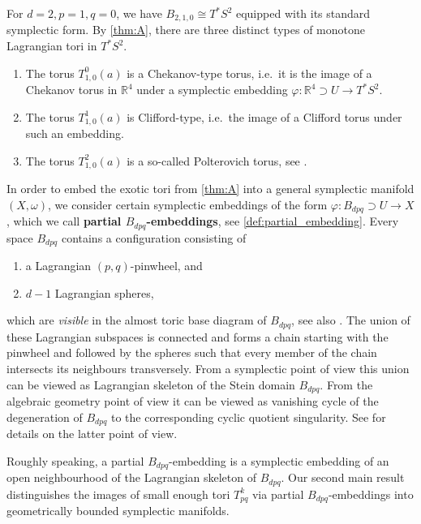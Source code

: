 \documentclass[12pt,a4paper,abstract=true,draft]{scrartcl}
\begin{document}
\begin{example}
    \label{ex:cotangent}
    For $d=2, p=1, q=0$, we have $B_{2,1,0} \cong T^*S^2$ equipped with its standard symplectic form.
By \cref{thm:A}, there are three distinct types of monotone Lagrangian tori in $T^*S^2$. 
    \begin{enumerate}
        \item The torus $T^0_{1,0}(a)$ is a Chekanov-type torus, i.e.\ it is the image of a Chekanov torus in $\mathbb{R}^4$ under a symplectic embedding $\varphi \colon \mathbb{R}^4 \supset U \rightarrow T^*S^2$.
        \item The torus $T^1_{1,0}(a)$ is Clifford-type, i.e.\ the image of a Clifford torus under such an embedding.
        \item The torus $T^2_{1,0}(a)$ is a so-called Polterovich torus, see \cite{AlbFra08}. 
    \end{enumerate} 
\end{example}

In order to embed the exotic tori from \cref{thm:A} into a general symplectic manifold $(X,\omega)$, we consider certain symplectic embeddings of the form $\varphi \colon B_{dpq} \supset U \rightarrow X$, which we call \textbf{partial $B_{dpq}$-embeddings}, see \cref{def:partial_embedding}. Every space $B_{dpq}$ contains a configuration consisting of 
\begin{enumerate}
    \item a Lagrangian $(p,q)$-pinwheel, and
    \item $d-1$ Lagrangian spheres,
\end{enumerate}
which are \emph{visible} in the almost toric base diagram of $B_{dpq}$, see also \cite[Chapter 5]{evans2021atfs}.
The union of these Lagrangian subspaces is connected and forms a chain starting with the pinwheel and followed by the spheres such that every member of the chain intersects its neighbours transversely.
From a symplectic point of view this union can be viewed as Lagrangian skeleton of the Stein domain $B_{dpq}$.
From the algebraic geometry point of view it can be viewed as vanishing cycle of the degeneration of $B_{dpq}$ to the corresponding cyclic quotient singularity.
See \cite{Eva19} for details on the latter point of view.

Roughly speaking, a partial $B_{dpq}$-embedding is a symplectic embedding of an open neighbourhood of the Lagrangian skeleton of $B_{dpq}$.
Our second main result distinguishes the images of small enough tori $T^k_{pq}$ via partial $B_{dpq}$-embeddings into geometrically bounded symplectic manifolds. 
\end{document}
